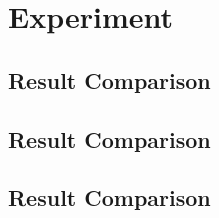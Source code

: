 \section{Experiment}

\subsection{Result Comparison}

\subsection{}

\subsection{Result Comparison}

\subsection{Result Comparison}


